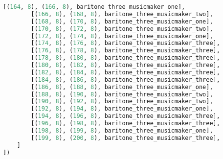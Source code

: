 \begin{lstlisting}[language=Python, caption=Invocation Source Code]
        [(164, 8), (166, 8), baritone_three_musicmaker_one],
        [(166, 8), (168, 8), baritone_three_musicmaker_two],
        [(168, 8), (170, 8), baritone_three_musicmaker_one],
        [(170, 8), (172, 8), baritone_three_musicmaker_two],
        [(172, 8), (174, 8), baritone_three_musicmaker_one],
        [(174, 8), (176, 8), baritone_three_musicmaker_three],
        [(176, 8), (178, 8), baritone_three_musicmaker_three],
        [(178, 8), (180, 8), baritone_three_musicmaker_three],
        [(180, 8), (182, 8), baritone_three_musicmaker_three],
        [(182, 8), (184, 8), baritone_three_musicmaker_three],
        [(184, 8), (186, 8), baritone_three_musicmaker_three],
        [(186, 8), (188, 8), baritone_three_musicmaker_one],
        [(188, 8), (190, 8), baritone_three_musicmaker_two],
        [(190, 8), (192, 8), baritone_three_musicmaker_two],
        [(192, 8), (194, 8), baritone_three_musicmaker_one],
        [(194, 8), (196, 8), baritone_three_musicmaker_three],
        [(196, 8), (198, 8), baritone_three_musicmaker_three],
        [(198, 8), (199, 8), baritone_three_musicmaker_one],
        [(199, 8), (200, 8), baritone_three_musicmaker_three],
    ]
])


\end{lstlisting}
